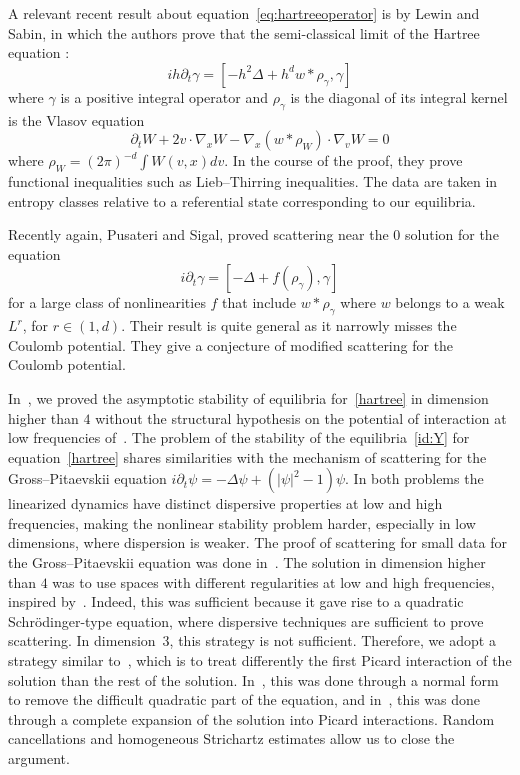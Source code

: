 \documentclass[AHL, Unicode, longabstracts,published]{cedram}
\newcommand{\pa}{\partial}
\begin{document}
\noindent A relevant recent result about equation~\eqref{eq:hartreeoperator} is by Lewin and Sabin, \cite{LS3} in which the authors prove that the semi-classical limit of the Hartree equation :
\begin{equation}\label{hartreesemicl}
ih \partial_t \gamma = \left[-h^2 \Delta + h^d w* \rho_\gamma, \gamma\right]
\end{equation}
where $\gamma$ is a positive integral operator and $\rho_\gamma$ is the diagonal of its integral kernel is the Vlasov equation
\begin{equation}\label{Vlasov}
\partial_t W + 2 v\cdot \nabla_x W - \nabla_x (w*\rho_W) \cdot \nabla_v W = 0
\end{equation}
where $\rho_W = (2\pi)^{-d} \int W(v,x) dv$. In the course of the proof, they prove functional inequalities such as Lieb--Thirring inequalities. The data are taken in entropy classes relative to a referential state corresponding to our equilibria.

Recently again, Pusateri and Sigal, \cite{PuSi19} proved scattering near the $0$ solution for the equation
\[
i\partial_t \gamma = \left[-\Delta + f(\rho_\gamma),\gamma\right]
\]
for a large class of nonlinearities $f$ that include $w*\rho_\gamma$ where $w$ belongs to a weak $L^r$, for $r\in (1,d)$. Their result is quite general as it narrowly misses the Coulomb potential. They give a conjecture of modified scattering for the Coulomb potential.

In~\cite{CodS}, we proved the asymptotic stability of equilibria for~\eqref{hartree} in dimension higher than $4$ without the structural hypothesis on the potential of interaction at low frequencies of~\cite{CHP2}. The problem of the stability of the equilibria~\eqref{id:Y} for equation~\eqref{hartree} shares similarities with the mechanism of scattering for the Gross--Pitaevskii equation $i\pa_t \psi=-\Delta \psi+(|\psi|^2-1)\psi$. In both problems the linearized dynamics have distinct dispersive properties at low and high frequencies, making the nonlinear stability problem harder, especially in low dimensions, where dispersion is weaker. The proof of scattering for small data for the Gross--Pitaevskii equation was done in~\cite{GHN,GNT3,GNT2,GNT}. The solution in dimension higher than $4$ was to use spaces with different regularities at low and high frequencies, inspired by~\cite{GNT}. Indeed, this was sufficient because it gave rise to a quadratic Schr\"odinger-type equation, where dispersive techniques are sufficient to prove scattering. In dimension~$3$, this strategy is not sufficient. Therefore, we adopt a strategy similar to~\cite{GHN,GNT3,GNT2,lewsab2}, which is to treat differently the first Picard interaction of the solution than the rest of the solution. In~\cite{GHN,GNT3,GNT2}, this was done through a normal form to remove the difficult quadratic part of the equation, and in~\cite{lewsab2}, this was done through a complete expansion of the solution into Picard interactions. Random cancellations and homogeneous Strichartz estimates allow us to close the argument.
\end{document}
